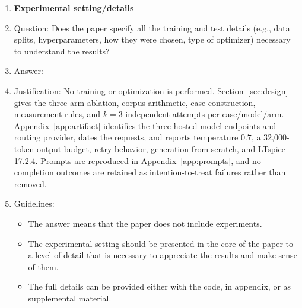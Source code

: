 \begin{enumerate}
\item {\bf Experimental setting/details}
    \item[] Question: Does the paper specify all the training and test details (e.g., data splits, hyperparameters, how they were chosen, type of optimizer) necessary to understand the results?
    \item[] Answer: \answerYes{}
    \item[] Justification: No training or optimization is performed. Section~\ref{sec:design} gives the three-arm ablation, corpus arithmetic, case construction, measurement rules, and $k=3$ independent attempts per case/model/arm. Appendix~\ref{app:artifact} identifies the three hosted model endpoints and routing provider, dates the requests, and reports temperature $0.7$, a 32{,}000-token output budget, retry behavior, generation from scratch, and LTspice 17.2.4. Prompts are reproduced in Appendix~\ref{app:prompts}, and no-completion outcomes are retained as intention-to-treat failures rather than removed.
    \item[] Guidelines:
    \begin{itemize}
        \item The answer \answerNA{} means that the paper does not include experiments.
        \item The experimental setting should be presented in the core of the paper to a level of detail that is necessary to appreciate the results and make sense of them.
        \item The full details can be provided either with the code, in appendix, or as supplemental material.
    \end{itemize}


\end{enumerate}
